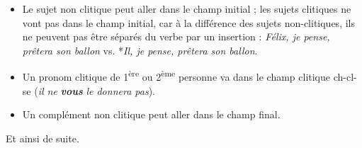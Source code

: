 \begin{itemize}
\item Le sujet non clitique peut aller dans le champ initial ; les sujets clitiques ne vont pas dans le champ initial, car à la différence des sujets non-clitiques, ils ne peuvent pas être séparés du verbe par un insertion : \textit{Félix, je pense, prêtera son ballon} vs. *\textit{Il, je pense, prêtera son ballon}.
\item Un pronom clitique de 1\textsuperscript{ère} ou 2\textsuperscript{ème} personne va dans le champ clitique ch-cl-se (\textit{il ne} \textbf{\textit{vous}} \textit{le donnera pas}).
\item Un complément non clitique peut aller dans le champ final.
\end{itemize}

Et ainsi de suite.

